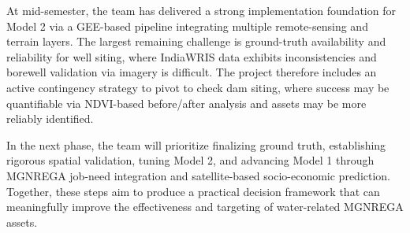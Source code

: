 \documentclass[12pt,a4paper]{report}
\begin{document}
At mid-semester, the team has delivered a strong implementation foundation for Model 2 via a GEE-based pipeline integrating multiple remote-sensing and terrain layers. The largest remaining challenge is ground-truth availability and reliability for well siting, where IndiaWRIS data exhibits inconsistencies and borewell validation via imagery is difficult. The project therefore includes an active contingency strategy to pivot to check dam siting, where success may be quantifiable via NDVI-based before/after analysis and assets may be more reliably identified.

In the next phase, the team will prioritize finalizing ground truth, establishing rigorous spatial validation, tuning Model 2, and advancing Model 1 through MGNREGA job-need integration and satellite-based socio-economic prediction. Together, these steps aim to produce a practical decision framework that can meaningfully improve the effectiveness and targeting of water-related MGNREGA assets.

\end{document}
